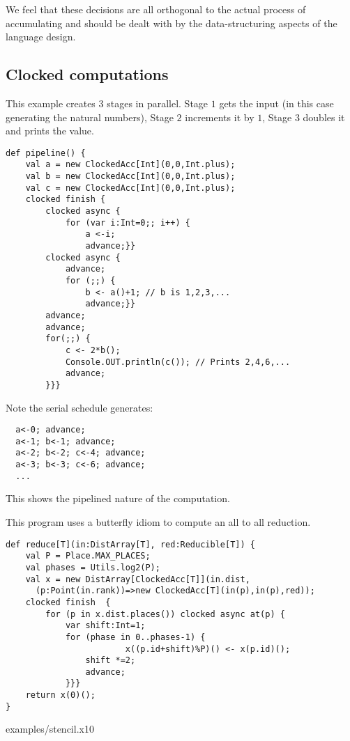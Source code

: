 We feel that these decisions are all orthogonal to the actual process
of accumulating and should be dealt with by the data-structuring
aspects of the language design.

\subsection{Clocked computations}

\begin{example}[Pipeline]
This example creates $3$ stages in parallel. Stage $1$ gets the input
(in this case generating the natural numbers), Stage $2$ increments it
by $1$, Stage $3$ doubles it and prints the value.
\begin{lstlisting}
def pipeline() {
    val a = new ClockedAcc[Int](0,0,Int.plus);
    val b = new ClockedAcc[Int](0,0,Int.plus);
    val c = new ClockedAcc[Int](0,0,Int.plus);
    clocked finish {
        clocked async {
            for (var i:Int=0;; i++) {
                a <-i;
                advance;}}
        clocked async {
            advance;
            for (;;) {
                b <- a()+1; // b is 1,2,3,...
                advance;}}
        advance;
        advance;
        for(;;) {
            c <- 2*b();
            Console.OUT.println(c()); // Prints 2,4,6,...
            advance;
        }}}
  \end{lstlisting}
Note the serial schedule generates:
\begin{lstlisting}
  a<-0; advance;
  a<-1; b<-1; advance;
  a<-2; b<-2; c<-4; advance;
  a<-3; b<-3; c<-6; advance;
  ...
\end{lstlisting}
\noindent This shows the pipelined nature of the computation.
\end{example}

\begin{example}
This program uses a butterfly idiom to compute an all to all
reduction.
\begin{lstlisting}
def reduce[T](in:DistArray[T], red:Reducible[T]) {
    val P = Place.MAX_PLACES;
    val phases = Utils.log2(P);
    val x = new DistArray[ClockedAcc[T]](in.dist,
      (p:Point(in.rank))=>new ClockedAcc[T](in(p),in(p),red));
    clocked finish  {
        for (p in x.dist.places()) clocked async at(p) {
            var shift:Int=1;
            for (phase in 0..phases-1) {
                        x((p.id+shift)%P)() <- x(p.id)();
                shift *=2;
                advance;
            }}}
    return x(0)();
}
\end{lstlisting}
\end{example}

 {examples/stencil.x10}
